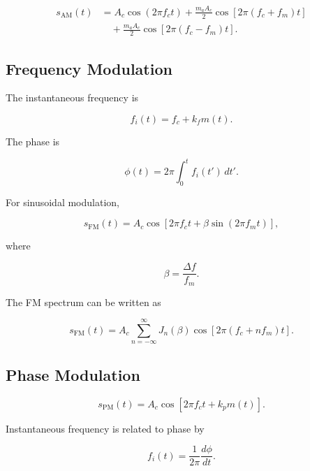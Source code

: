 \documentclass[12pt]{article}
\begin{document}
\begin{align}
s_{\text{AM}}(t)
&=
A_c\cos(2\pi f_ct)
+
\frac{m_aA_c}{2}
\cos[2\pi(f_c+f_m)t] \nonumber\\
&\quad+
\frac{m_aA_c}{2}
\cos[2\pi(f_c-f_m)t].
\end{align}

\subsection{Frequency Modulation}

The instantaneous frequency is

\begin{equation}
f_i(t)=f_c+k_fm(t).
\end{equation}

The phase is

\begin{equation}
\phi(t)
=
2\pi\int_0^t f_i(t')\,dt'.
\end{equation}

For sinusoidal modulation,

\begin{equation}
\boxed{
s_{\text{FM}}(t)
=
A_c
\cos
\left[
2\pi f_ct+\beta\sin(2\pi f_mt)
\right]
},
\end{equation}

where

\begin{equation}
\beta=\frac{\Delta f}{f_m}.
\end{equation}

The FM spectrum can be written as

\begin{equation}
s_{\text{FM}}(t)
=
A_c
\sum_{n=-\infty}^{\infty}
J_n(\beta)
\cos[2\pi(f_c+nf_m)t].
\end{equation}

\subsection{Phase Modulation}

\begin{equation}
\boxed{
s_{\text{PM}}(t)
=
A_c\cos[2\pi f_ct+k_pm(t)]
}.
\end{equation}

Instantaneous frequency is related to phase by

\begin{equation}
f_i(t)
=
\frac{1}{2\pi}\frac{d\phi}{dt}.
\end{equation}
\end{document}
